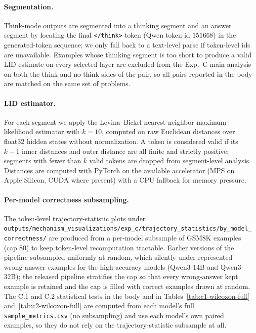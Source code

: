 \documentclass{article}
\theoremstyle{plain}
\theoremstyle{definition}
\theoremstyle{remark}
\begin{document}
\paragraph{Segmentation.} Think-mode outputs are segmented into a thinking segment and an answer segment by locating the final \texttt{</think>} token (Qwen token id $151668$) in the generated-token sequence; we only fall back to a text-level parse if token-level ids are unavailable. Examples whose thinking segment is too short to produce a valid LID estimate on every selected layer are excluded from the Exp.\ C main analysis on both the think and no-think sides of the pair, so all pairs reported in the body are matched on the same set of problems.

\paragraph{LID estimator.} For each segment we apply the Levina--Bickel nearest-neighbor maximum-likelihood estimator with $k=10$, computed on raw Euclidean distances over float32 hidden states without normalization. A token is considered valid if its $k{-}1$ inner distances and outer distance are all finite and strictly positive; segments with fewer than $k$ valid tokens are dropped from segment-level analysis. Distances are computed with PyTorch on the available accelerator (MPS on Apple Silicon, CUDA where present) with a CPU fallback for memory pressure.

\paragraph{Per-model correctness subsampling.} The token-level trajectory-statistic plots under \texttt{outputs/mechanism\_visualizations/exp\_c/trajectory\_statistics/by\_model\_correctness/} are produced from a per-model subsample of GSM8K examples (cap $80$) to keep token-level recomputation tractable. Earlier versions of the pipeline subsampled uniformly at random, which silently under-represented wrong-answer examples for the high-accuracy models (Qwen3-14B and Qwen3-32B); the released pipeline stratifies the cap so that {every} wrong-answer kept example is retained and the cap is filled with correct examples drawn at random. The C.1 and C.2 statistical tests in the body and in Tables~\ref{tab:c1-wilcoxon-full} and~\ref{tab:c2-wilcoxon-full} are computed from each model's full \texttt{sample\_metrics.csv} (no subsampling) and use each model's own paired examples, so they do not rely on the trajectory-statistic subsample at all.
\end{document}
